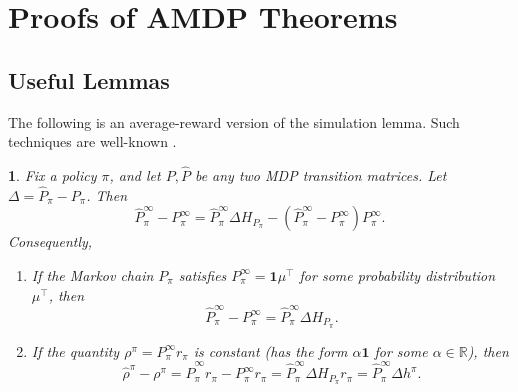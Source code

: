 \documentclass{article}
\theoremstyle{plain}
\theoremstyle{plain}
\newtheorem{lem}[thm]{\protect\lemmaname}
\theoremstyle{remark}
\theoremstyle{plain}
\theoremstyle{plain}
\providecommand{\lemmaname}{Lemma}
\newcommand{\R}{\mathbb{R}}
\newcommand{\Phat}{\widehat{P}}
\newcommand{\one}{\mathbf{1}}
\newcommand{\rhohat}{\widehat{\rho}}
\begin{document}
\section{Proofs of AMDP Theorems}
\label{sec:AMDP_appendix_main}

\subsection{Useful Lemmas}

\label{sec:key_AMDP_lemmas}

The following is an average-reward version of the simulation lemma. Such techniques are well-known \citep{cao_single_1999, meyer_jr_condition_1980}.
\begin{lem}
\label{lem:average_reward_simulation_lemma}
    Fix a policy $\pi$, and let $P, \Phat$ be any two MDP transition matrices. Let $\Delta = \Phat_\pi - P_\pi$. Then
    \[
    \Phat_\pi^\infty - P_\pi^\infty = \Phat_\pi^\infty \Delta H_{P_\pi} - (\Phat_\pi^\infty - P_\pi^\infty)P^\infty_\pi.
    \]
    Consequently,
    \begin{enumerate}
        \item If the Markov chain $P_\pi$ satisfies $P^\infty_\pi = \one \mu^\top$ for some probability distribution $\mu^\top$, then
        \[
        \Phat_\pi^\infty - P_\pi^\infty = \Phat_\pi^\infty \Delta H_{P_\pi}.
        \]

        \item If the quantity $\rho^\pi = P^\infty_\pi r_\pi$ is constant (has the form $\alpha \one$ for some $\alpha \in \R$), then
        \[
        \rhohat^\pi - \rho^\pi = \Phat_\pi^\infty r_\pi - P_\pi^\infty r_\pi = \Phat_\pi^\infty \Delta H_{P_\pi} r_\pi = \Phat_\pi^\infty \Delta h^\pi.
        \]
    \end{enumerate}
\end{lem}
\end{document}
